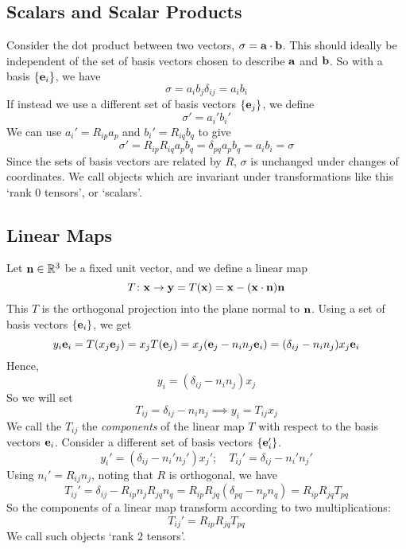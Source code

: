 \subsection{Scalars and Scalar Products}
Consider the dot product between two vectors, $\sigma = \vb a \cdot \vb b$. This should ideally be independent of the set of basis vectors chosen to describe $\vb a$ and $\vb b$. So with a basis $\{ \vb e_i \}$, we have
\[ \sigma = a_i b_j \delta_{ij} = a_i b_i \]
If instead we use a different set of basis vectors $\{ \vb e_j \}$, we define
\[ \sigma' = a_i' b_i' \]
We can use $a_i' = R_{ip} a_p$ and $b_i' = R_{iq} b_q$ to give
\[ \sigma' = R_{ip} R_{iq} a_p b_q = \delta_{pq} a_p b_q = a_i b_i = \sigma \]
Since the sets of basis vectors are related by $R$, $\sigma$ is unchanged under changes of coordinates. We call objects which are invariant under transformations like this `rank 0 tensors', or `scalars'.

\subsection{Linear Maps}
Let $\vb n \in \mathbb R^3$ be a fixed unit vector, and we define a linear map
\[ T \colon \vb x \to \vb y = T(\vb x) = \vb x - (\vb x \cdot \vb n) \vb n \]
This $T$ is the orthogonal projection into the plane normal to $\vb n$. Using a set of basis vectors $\{ \vb e_i \}$, we get
\[ y_i \vb e_i = T(x_j \vb e_j) = x_j T(\vb e_j) = x_j (\vb e_j - n_i n_j \vb e_i) = (\delta_{ij} - n_i n_j) x_j \vb e_i \]
Hence,
\[ y_i = (\delta_{ij} - n_i n_j) x_j \]
So we will set
\[ T_{ij} = \delta_{ij} - n_i n_j \implies y_i = T_{ij} x_j \]
We call the $T_{ij}$ the \textit{components} of the linear map $T$ with respect to the basis vectors $\vb e_i$. Consider a different set of basis vectors $\{ \vb e_i' \}$.
\[ y_i' = (\delta_{ij} - n_i' n_j') x_j';\quad T_{ij}' = \delta_{ij} - n_i' n_j' \]
Using $n_i' = R_{ij} n_j$, noting that $R$ is orthogonal, we have
\[ T_{ij}' = \delta_{ij} - R_{ip} n_j R_{jq} n_q = R_{ip} R_{jq} (\delta_{pq} - n_p n_q) = R_{ip} R_{jq} T_{pq} \]
So the components of a linear map transform according to two multiplications:
\[ T_{ij}' = R_{ip} R_{jq} T_{pq} \]
We call such objects `rank 2 tensors'.
